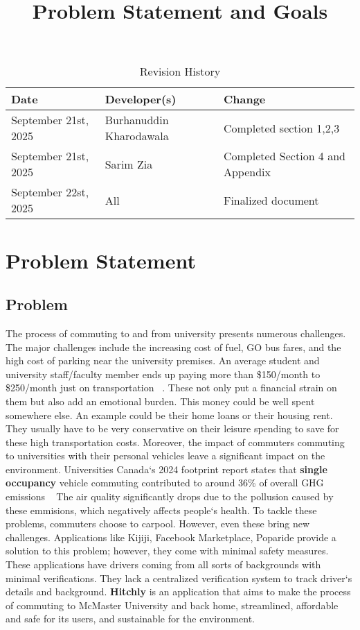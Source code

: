 \documentclass{article}
\title{Problem Statement and Goals\\\progname}
\author{\authname}
\date{}
\begin{document}
\maketitle

\begin{table}[hp]
\caption{Revision History} \label{TblRevisionHistory}
\begin{tabularx}{\textwidth}{llX}
\toprule
\textbf{Date} & \textbf{Developer(s)} & \textbf{Change}\\
\midrule
September 21st, 2025 & Burhanuddin Kharodawala & Completed section 1,2,3\\
September 21st, 2025 & Sarim Zia & Completed Section 4 and Appendix\\
September 22st, 2025 & All & Finalized document\\
\bottomrule
\end{tabularx}
\end{table}

\section{Problem Statement}

\subsection{Problem}

The process of commuting to and from university presents numerous 
challenges. The major challenges include the 
increasing cost of fuel, GO bus fares, and the high 
cost of parking near the university premises. 
An average student and university staff/faculty 
member ends up paying more than 
\$150/month to \$250/month just on transportation ~\citep{ChandaAndSo2025}.
These not only put a financial strain on them but also 
add an emotional burden. This money could be well spent somewhere else. 
An example could be their home loans or their housing rent. 
They usually have to be very conservative on their leisure spending to save for these high transportation costs.
Moreover, the impact 
of commuters commuting to universities with their 
personal vehicles leave a significant impact on 
the environment. Universities Canada`s 2024 
footprint report states that \textbf{single occupancy} vehicle commuting contributed to around 
36\% of overall GHG emissions ~\citep{Kebirungi2024}
The air quality significantly drops due to the pollusion caused by these emmisions, which negatively affects people`s health.
To tackle these problems, commuters choose 
to carpool. However, even these bring new 
challenges. Applications like Kijiji, 
Facebook Marketplace, Poparide provide a 
solution to this problem; however, they come 
with minimal safety measures. These applications 
have drivers coming from all sorts of backgrounds 
with minimal verifications. They lack a centralized 
verification system to track driver`s details and background. 
\textbf{Hitchly} is an application that aims to make the process of commuting to McMaster 
University and back home, streamlined, affordable and safe for its users, and 
sustainable for the environment. 
\end{document}
